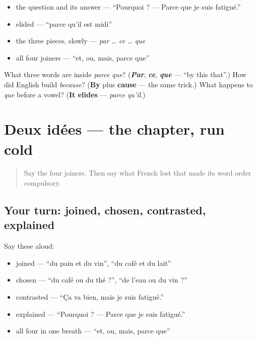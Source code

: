 \begin{itemize}
\raggedright
  \item the question and its answer — \textquotedblleft{}Pourquoi ? — Parce que je suis fatigué.\textquotedblright{}
  \item elided — \textquotedblleft{}parce qu'il est midi\textquotedblright{}
  \item the three pieces, slowly — \emph{par … ce … que}
  \item all four joiners — \textquotedblleft{}et, ou, mais, parce que\textquotedblright{}
\end{itemize}

\begin{tcolorbox}[breakable,colback=teal!4,colframe=teal!35!black,title={Before you move on}]
What three words are inside \emph{parce que}? (\emph{\textbf{Par}}, \emph{\textbf{ce}}, \emph{\textbf{que}} — \textquotedblleft{}by this that\textquotedblright{}.) How did English build \emph{because}? (\textbf{By} plus \textbf{cause} — the same trick.) What happens to \emph{que} before a vowel? (\textbf{It elides} — \emph{parce qu'il}.)
\end{tcolorbox}
\section[Practice]{Deux idées — the chapter, run cold}

\label{lesson:FR-R36-deux-idees}



\begin{quote}
Say the four joiners. Then say what French lost that made its word order compulsory.
\end{quote}

\subsection*{Your turn: joined, chosen, contrasted, explained}
Say these aloud:

\begin{itemize}
\raggedright
  \item joined — \textquotedblleft{}du pain et du vin\textquotedblright{}, \textquotedblleft{}du café et du lait\textquotedblright{}
  \item chosen — \textquotedblleft{}du café ou du thé ?\textquotedblright{}, \textquotedblleft{}de l'eau ou du vin ?\textquotedblright{}
  \item contrasted — \textquotedblleft{}Ça va bien, mais je suis fatigué.\textquotedblright{}
  \item explained — \textquotedblleft{}Pourquoi ? — Parce que je suis fatigué.\textquotedblright{}
  \item all four in one breath — \textquotedblleft{}et, ou, mais, parce que\textquotedblright{}
\end{itemize}

